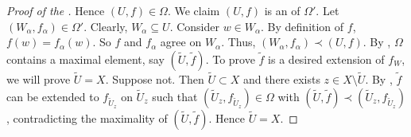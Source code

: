 \begin{proof}[Proof of the ]
Hence $(U, f) \in \Omega$. We claim $(U, f)$ is an  of $\Omega'$. Let $(W_\alpha, f_\alpha) \in \Omega'$. Clearly, $W_\alpha \subseteq U$. Consider $w \in W_\alpha$. By definition of $f$, $f(w) = f_\alpha(w)$. So $f$ and $f_\alpha$ agree on $W_\alpha$. Thus, $(W_\alpha, f_\alpha) \prec (U, f)$. By , $\Omega$ contains a maximal element, say $(\widetilde{U}, \widetilde{f})$. To prove $\widetilde{f}$ is a desired extension of $f_W$, we will prove $\widetilde{U} = X$. Suppose not. Then $\widetilde{U} \subset X$ and there exists $z \in X \setminus \widetilde{U}$. By , $\widetilde{f}$ can be extended to $f_{\widetilde{U}_z}$ on ${\widetilde{U}_z}$ such that $(\widetilde{U}_z, f_{\widetilde{U}_z}) \in \Omega$ with $(\widetilde{U}, \widetilde{f}) \prec (\widetilde{U}_z, f_{\widetilde{U}_z})$, contradicting the maximality of $(\widetilde{U}, \widetilde{f})$. Hence $\widetilde{U} = X$.
\end{proof}